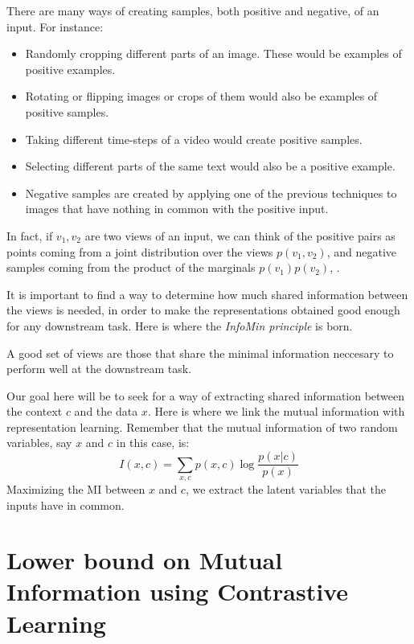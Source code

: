 There are many ways of creating samples, both positive and negative, of an input. For instance:
\begin{itemize}
    \item Randomly cropping different parts of an image. These would be examples of positive examples.
    \item Rotating or flipping images or crops of them would also be examples of positive samples.
    
    \item Taking different time-steps of a video would create positive samples.
    \item Selecting different parts of the same text would also be a positive example.    
    \item Negative samples are created by applying one of the previous techniques to images that have nothing in common with the positive input.
\end{itemize}

In fact, if $v_1,v_2$ are two views of an input, we can think of the positive pairs as points coming from a joint distribution over the views $p(v_1,v_2)$, and negative samples coming from the product of the marginals $p(v_1)p(v_2)$, \citep{tian_what_2020}.

It is important to find a way to determine how much shared information between the views is needed, in order to make the representations obtained good enough for any downstream task. Here is where the \emph{InfoMin principle} is born. 

\begin{ndef}
    A good set of views are those that share the minimal information neccesary to perform well at the downstream task.
\end{ndef} 


Our goal here will be to seek for a way of extracting shared information between the context $c$ and the data $x$. Here is where we link the mutual information with representation learning. Remember that the mutual information of two random variables, say $x$ and $c$ in this case, is:
\begin{equation}\label{EQ:MI}
I(x,c) = \sum_{x,c}p(x,c)\log\frac{p(x|c)}{p(x)}
\end{equation}
Maximizing the MI between $x$ and $c$, we extract the latent variables that the inputs have in common. 

\section{Lower bound on Mutual Information using Contrastive Learning}


